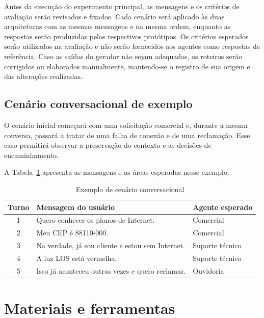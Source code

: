 Antes da execução do experimento principal, as mensagens e os
critérios de avaliação serão revisados e fixados. Cada cenário será
aplicado às duas arquiteturas com as mesmas mensagens e na mesma
ordem, enquanto as respostas serão produzidas pelos respectivos
protótipos. Os critérios esperados serão utilizados na avaliação
e não serão fornecidos aos agentes como respostas de referência.
Caso as saídas do gerador não sejam adequadas, os roteiros serão
corrigidos ou elaborados manualmente, mantendo-se o registro
de sua origem e das alterações realizadas.

\subsection{Cenário conversacional de exemplo}\label{subsec:cenario-exemplo}

O cenário inicial começará com uma solicitação comercial e, durante a mesma conversa, passará a tratar de uma falha de conexão e de uma reclamação. Esse caso permitirá observar a preservação do contexto e as decisões de encaminhamento.

A Tabela~\ref{tab:cenario-exemplo} apresenta as mensagens
e as áreas esperadas nesse exemplo.

\begin{table}[htb]
    \ABNTEXfontereduzida
    \centering
    \caption{Exemplo de cenário conversacional}
    \label{tab:cenario-exemplo}
    \begin{tabular}{c p{6.8cm} p{3.5cm}}
        \toprule
        Turno & Mensagem do usuário & Agente esperado \\
        \midrule
        1 & Quero conhecer os planos de Internet. & Comercial \\
        2 & Meu CEP é 88110-000. & Comercial \\
        3 & Na verdade, já sou cliente e estou sem Internet. & Suporte técnico \\
        4 & A luz LOS está vermelha. & Suporte técnico \\
        5 & Isso já aconteceu outras vezes e quero reclamar. & Ouvidoria \\
        \bottomrule
    \end{tabular}
    \fonteproprioautor
\end{table}

%


\section{Materiais e ferramentas}\label{sec:materiais-ferramentas}


